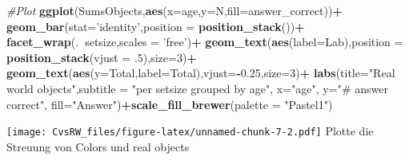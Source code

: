 \documentclass[
]{article}
\newenvironment{Shaded}{\begin{snugshade}}{\end{snugshade}}
\newcommand{\CommentTok}[1]{\textcolor[rgb]{0.56,0.35,0.01}{\textit{#1}}}
\newcommand{\DataTypeTok}[1]{\textcolor[rgb]{0.13,0.29,0.53}{#1}}
\newcommand{\DecValTok}[1]{\textcolor[rgb]{0.00,0.00,0.81}{#1}}
\newcommand{\FloatTok}[1]{\textcolor[rgb]{0.00,0.00,0.81}{#1}}
\newcommand{\KeywordTok}[1]{\textcolor[rgb]{0.13,0.29,0.53}{\textbf{#1}}}
\newcommand{\NormalTok}[1]{#1}
\newcommand{\OperatorTok}[1]{\textcolor[rgb]{0.81,0.36,0.00}{\textbf{#1}}}
\newcommand{\StringTok}[1]{\textcolor[rgb]{0.31,0.60,0.02}{#1}}
\begin{document}
\begin{Shaded}
\begin{Highlighting}[]
\CommentTok{#Plot}
\KeywordTok{ggplot}\NormalTok{(SumsObjects,}\KeywordTok{aes}\NormalTok{(}\DataTypeTok{x=}\NormalTok{age,}\DataTypeTok{y=}\NormalTok{N,}\DataTypeTok{fill=}\NormalTok{answer_correct))}\OperatorTok{+}
\StringTok{  }\KeywordTok{geom_bar}\NormalTok{(}\DataTypeTok{stat=}\StringTok{'identity'}\NormalTok{,}\DataTypeTok{position =} \KeywordTok{position_stack}\NormalTok{())}\OperatorTok{+}
\StringTok{  }\KeywordTok{facet_wrap}\NormalTok{(.}\OperatorTok{~}\NormalTok{setsize,}\DataTypeTok{scales =} \StringTok{'free'}\NormalTok{)}\OperatorTok{+}
\StringTok{  }\KeywordTok{geom_text}\NormalTok{(}\KeywordTok{aes}\NormalTok{(}\DataTypeTok{label=}\NormalTok{Lab),}\DataTypeTok{position =} \KeywordTok{position_stack}\NormalTok{(}\DataTypeTok{vjust =} \FloatTok{.5}\NormalTok{),}\DataTypeTok{size=}\DecValTok{3}\NormalTok{)}\OperatorTok{+}
\StringTok{  }\KeywordTok{geom_text}\NormalTok{(}\KeywordTok{aes}\NormalTok{(}\DataTypeTok{y=}\NormalTok{Total,}\DataTypeTok{label=}\NormalTok{Total),}\DataTypeTok{vjust=}\OperatorTok{-}\FloatTok{0.25}\NormalTok{,}\DataTypeTok{size=}\DecValTok{3}\NormalTok{)}\OperatorTok{+}
\StringTok{  }\KeywordTok{labs}\NormalTok{(}\DataTypeTok{title=}\StringTok{"Real world objects"}\NormalTok{,}\DataTypeTok{subtitle =} \StringTok{"per setsize grouped by age"}\NormalTok{, }\DataTypeTok{x=}\StringTok{"age"}\NormalTok{, }\DataTypeTok{y=}\StringTok{"# answer correct"}\NormalTok{, }\DataTypeTok{fill=}\StringTok{"Answer"}\NormalTok{)}\OperatorTok{+}\KeywordTok{scale_fill_brewer}\NormalTok{(}\DataTypeTok{palette =} \StringTok{"Pastel1"}\NormalTok{)}
\end{Highlighting}
\end{Shaded}

\texttt{[image: CvsRW\_files/figure-latex/unnamed-chunk-7-2.pdf]} Plotte
die Streuung von Colors und real objects

\begin{Shaded}
\end{Shaded}
\end{document}
